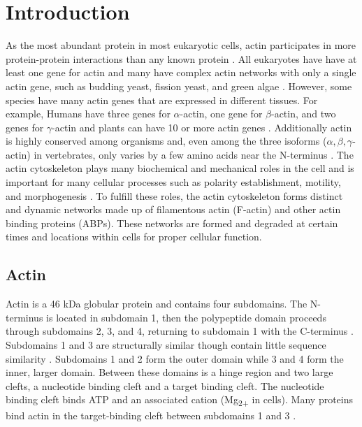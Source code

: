 
\chapter{Introduction}\label{ch:intro}
As the most abundant protein in most eukaryotic cells, actin participates in more protein-protein interactions than any known protein \citep{dominguez_actin_2011}. All eukaryotes have have at least one gene for actin and many have complex actin networks with only a single actin gene, such as budding yeast, fission yeast, and green algae \citep{pollard_actin_2016}. However, some species have many actin genes that are expressed in different tissues. For example, Humans have three genes for $\alpha$-actin, one gene for $\beta$-actin, and two genes for $\gamma$-actin and plants can have 10 or more actin genes \citep{pollard_actin_2016}. Additionally actin is highly conserved among organisms and, even among the three isoforms ($\alpha, \beta, \gamma$-actin) in vertebrates, only varies by a few amino acids near the N-terminus \citep{dominguez_actin_2011}. The actin cytoskeleton plays many biochemical and mechanical roles in the cell and is important for many cellular processes such as polarity establishment, motility, and morphogenesis \citep{blanchoin_actin_2014}. To fulfill these roles, the actin cytoskeleton forms distinct and dynamic networks made up of filamentous actin (F-actin) and other actin binding proteins (ABPs). These networks are formed and degraded at certain times and locations within cells for proper cellular function. 

\section{Actin}\label{actin-intro}

Actin is a 46 kDa globular protein and contains four subdomains. The N-terminus is located in subdomain 1, then the polypeptide domain proceeds through subdomains 2, 3, and 4, returning to subdomain 1 with the C-terminus \citep{pollard_actin_2016}. Subdomains 1 and 3 are structurally similar though contain little sequence similarity \citep{dominguez_actin_2009,pollard_actin_2016}. Subdomains 1 and 2 form the outer domain while 3 and 4 form the inner, larger domain. Between these domains is a hinge region and two large clefts, a nucleotide binding cleft and a target binding cleft. The nucleotide binding  cleft binds ATP and an associated cation (Mg\textsubscript{2+} in cells). Many proteins bind actin in the target-binding cleft between subdomains 1 and 3 \citep{dominguez_actin_2009}.


